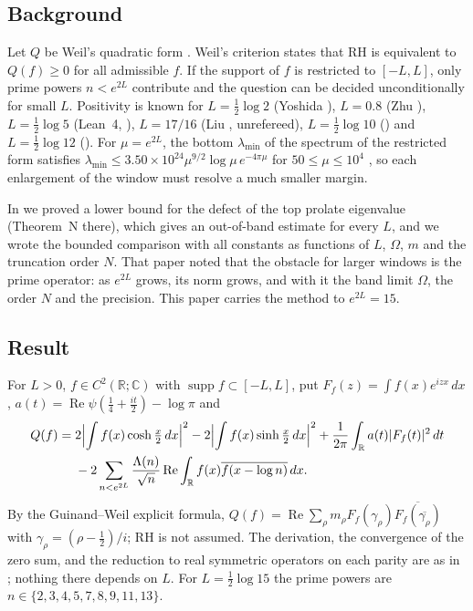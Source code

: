 \documentclass[11pt]{amsart}
\theoremstyle{remark}
\numberwithin{equation}{section}
\newcommand{\R}{\mathbb{R}}
\newcommand{\C}{\mathbb{C}}
\begin{document}
\subsection{Background}
Let $Q$ be Weil's quadratic form \cite{Weil1952,Bombieri2000}. Weil's criterion states that RH is equivalent to $Q(f)\ge0$ for all admissible $f$. If the support of $f$ is restricted to $[-L,L]$, only prime powers $n<e^{2L}$ contribute and the question can be decided unconditionally for small $L$. Positivity is known for $L=\frac12\log2$ (Yoshida \cite{Yoshida1992}), $L=0.8$ (Zhu \cite{Zhu2026}), $L=\frac12\log5$ (Lean~4, \cite{MoriLog5}), $L=17/16$ (Liu \cite{Liu2026}, unrefereed), $L=\frac12\log10$ (\cite{MoriVI}) and $L=\frac12\log12$ (\cite{MoriVII}). For $\mu=e^{2L}$, the bottom $\lambda_{\min}$ of the spectrum of the restricted form satisfies $\lambda_{\min}\le3.50\times10^{24}\mu^{9/2}\log\mu\,e^{-4\pi\mu}$ for $50\le\mu\le10^4$ \cite[Theorem~K]{MoriWeilV}, so each enlargement of the window must resolve a much smaller margin.

In \cite{MoriVII} we proved a lower bound for the defect of the top prolate eigenvalue (Theorem~N there), which gives an out-of-band estimate for every $L$, and we wrote the bounded comparison with all constants as functions of $L$, $\Omega$, $m$ and the truncation order $N$. That paper noted that the obstacle for larger windows is the prime operator: as $e^{2L}$ grows, its norm grows, and with it the band limit $\Omega$, the order $N$ and the precision. This paper carries the method to $e^{2L}=15$.

\subsection{Result}
For $L>0$, $f\in C^2(\R;\C)$ with $\operatorname{supp}f\subset[-L,L]$, put $F_f(z)=\int f(x)e^{izx}\,dx$, $a(t)=\operatorname{Re}\psi(\tfrac14+\tfrac{it}2)-\log\pi$ and
\begin{equation}\label{eq:Q}
\begin{aligned}
Q(f)={}&2\Bigl|\int f(x)\cosh\tfrac x2\,dx\Bigr|^2-2\Bigl|\int f(x)\sinh\tfrac x2\,dx\Bigr|^2
+\frac1{2\pi}\int_\R a(t)|F_f(t)|^2\,dt\\
&-2\sum_{n<e^{2L}}\frac{\Lambda(n)}{\sqrt n}\operatorname{Re}\int_\R f(x)\overline{f(x-\log n)}\,dx .
\end{aligned}
\end{equation}
By the Guinand--Weil explicit formula, $Q(f)=\operatorname{Re}\sum_\rho m_\rho F_f(\gamma_\rho)\overline{F_f(\overline{\gamma_\rho})}$ with $\gamma_\rho=(\rho-\frac12)/i$; RH is not assumed. The derivation, the convergence of the zero sum, and the reduction to real symmetric operators on each parity are as in \cite[Section~2]{MoriVI}; nothing there depends on $L$. For $L=\frac12\log15$ the prime powers are $n\in\{2,3,4,5,7,8,9,11,13\}$.
\end{document}
